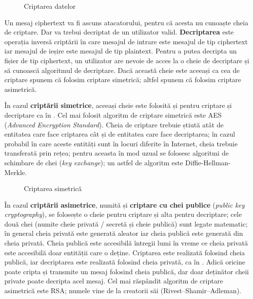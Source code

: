\begin{figure}[htbp]
  \centering
  \def\svgwidth{\columnwidth}
  
  \caption{Criptarea datelor}
  \label{fig:sec:encryption}
\end{figure}

Un mesaj ciphertext va fi ascuns atacatorului, pentru că acesta nu cunoaște cheia de criptare. Dar va trebui decriptat de un utilizator valid. \textbf{Decriptarea} este operația inversă criptării în care mesajul de intrare este mesajul de tip ciphertext iar mesajul de ieșire este mesajul de tip plaintext. Pentru a putea decripta un fișier de tip ciphertext, un utilizator are nevoie de acces la o cheie de decriptare și să cunoască algoritmul de decriptare. Dacă această cheie este aceeași ca cea de criptare spunem că folosim criptare simetrică; altfel spunem că folosim criptare asimetrică.

În cazul \textbf{criptării simetrice}, aceeași cheie este folosită și pentru criptare și decriptare ca în . Cel mai folosit algoritm de criptare simetrică este AES (\textit{Advanced Encryption Standard}). Cheia de criptare trebuie știută atât de entitatea care face criptarea cât și de entitatea care face decriptarea; în cazul probabil în care aceste entități sunt în locuri diferite în Internet, cheia trebuie transferată prin rețea; pentru aceasta în mod uzual se folosesc algoritmi de schimbare de chei (\textit{key exchange}); un astfel de algoritm este Diffie-Hellman-Merkle.

\begin{figure}[htbp]
  \centering
  \def\svgwidth{\columnwidth}
  
  \caption{Criptarea simetrică}
  \label{fig:sec:symmetric-encryption}
\end{figure}

În cazul \textbf{criptării asimetrice}, numită și \textbf{criptare cu chei publice} (\textit{public key cryptography}), se folosește o cheie pentru criptare și alta pentru decriptare; cele două chei (numite cheie privată / secretă și cheie publică) sunt legate matematic; în general cheia privată este generată aleator iar cheia publică este generată din cheia privată. Cheia publică este accesibilă întregii lumi în vreme ce cheia privată este accesibilă doar entității care o deține. Criptarea este realizată folosind cheia publică, iar decriptarea este realizată folosind cheia privată, ca în . Adică oricine poate cripta și transmite un mesaj folosind cheia publică, dar doar deținător cheii private poate decripta acel mesaj. Cel mai răspândit algoritm de criptare asimetrică este RSA; numele vine de la creatorii săi (Rivest–Shamir–Adleman).


